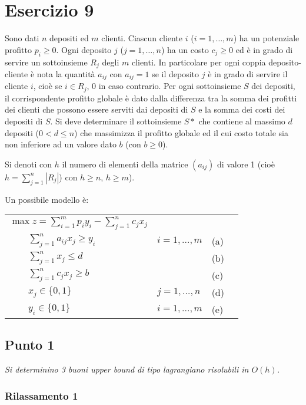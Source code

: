 \documentclass[11pt]{book}
\begin{document}
\chapter*{Esercizio 9}

Sono dati $n$ depositi ed $m$ clienti. Ciascun cliente $i$
($i=1,\dots,m$) ha un potenziale profitto $p_i \geq 0$. Ogni deposito
$j$ ($j=1,\dots,n$) ha un costo $c_j \geq 0$ ed \`e in grado di
servire un sottoinsieme $R_j$ degli $m$ clienti. In particolare per
ogni coppia deposito-cliente \`e nota la quantit\`a $a_{ij}$ con
$a_{ij}=1$ se il deposito $j$ \`e in grado di servire il cliente $i$,
cio\`e se $i \in R_j$, 0 in caso contrario. Per ogni sottoinsieme $S$
dei depositi, il corrispondente profitto globale \`e dato dalla
differenza tra la somma dei profitti dei clienti che possono essere
serviti dai depositi di $S$ e la somma dei costi dei depositi di
$S$. Si deve determinare il sottoinsieme $S*$ che contiene al massimo
$d$ depositi ($0 < d \leq n$) che massimizza il profitto globale ed il
cui costo totale sia non inferiore ad un valore dato $b$ (con $b \geq
0$).

Si denoti con $h$ il numero di elementi della matrice $(a_{ij})$ di
valore 1 (cio\`e $h = \sum_{j=1}^n | R_j |$) con $h\geq n$, $h \geq
m$).

Un possibile modello \`e:

\begin{center}
\begin{tabular}{llp{1cm}l}
$\max z = \sum\limits_{i=1}^m p_iy_i - \sum\limits_{j=1}^n c_jx_j$\\
$\qquad \sum\limits_{j=1}^n a_{ij}x_j \geq y_i$ & $i=1,\dots,m$ & (a)\\
$\qquad \sum\limits_{j=1}^n x_j \leq d$ & & (b) \\
$\qquad \sum\limits_{j=1}^n c_jx_j \geq b$ & & (c) \\
$\qquad x_j \in \{0,1\}$ & $j=1,\dots,n$ & (d) \\
$\qquad y_i \in \{0,1\}$ & $i=1,\dots,m$ & (e) \\
\end{tabular}
\end{center}

\section*{Punto 1}

\textit{Si determinino 3 buoni upper bound di tipo lagrangiano
  risolubili in $O(h)$.}

\subsection*{Rilassamento 1}
\end{document}
